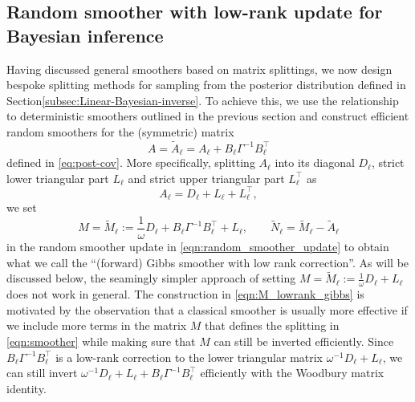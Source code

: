\documentclass[11pt,english]{article}
\theoremstyle{plain}
\theoremstyle{plain}
\theoremstyle{plain}
\theoremstyle{plain}
\numberwithin{equation}{section}
\begin{document}
\subsection{Random smoother with low-rank update for Bayesian inference}\label{subsec:Gibbs}
Having discussed general smoothers based on matrix splittings, we now design bespoke splitting methods for sampling from the posterior distribution defined in Section\ref{subsec:Linear-Bayesian-inverse}. To achieve this, we use the relationship to deterministic smoothers outlined in the previous section and construct efficient random smoothers for the (symmetric) matrix
\begin{equation}
    A = \widetilde{A}_\ell = A_\ell + B_{\ell} \Gamma^{-1} B_{\ell}^{\top}
\end{equation}
defined in \eqref{eq:post-cov}. More specifically, splitting $A_\ell$ into its diagonal $D_\ell$, strict lower triangular part $L_\ell$ and strict upper triangular part $L_\ell^\top$ as
\begin{equation}
    A_\ell = D_\ell + L_\ell + L_\ell^\top,
\end{equation}
we set
\begin{equation}
    M = \widetilde{M}_\ell :=
    \frac{1}{\omega} D_\ell + B_{\ell} \Gamma^{-1}B_{\ell}^{\top} + L_\ell,\qquad \widetilde{N}_\ell = \widetilde{M}_\ell-\widetilde{A}_\ell\label{eqn:M_lowrank_gibbs}
\end{equation}
in the random smoother update in \eqref{eqn:random_smoother_update} to obtain what we call the ``(forward) Gibbs smoother with low rank correction''. As will be discussed below, the seamingly simpler approach of setting $M = \widetilde{M}_\ell :=\frac{1}{\omega} D_\ell + L_\ell$ does not work in general. The construction in \eqref{eqn:M_lowrank_gibbs} is motivated by the observation that a classical smoother is usually more effective if we include more terms in the matrix $M$ that defines the splitting in \eqref{eqn:smoother} while making sure that $M$ can still be inverted efficiently. Since $B_{\ell} \Gamma^{-1} B_{\ell}^{\top}$ is a low-rank correction to the lower triangular matrix $\omega^{-1}D_\ell+L_\ell$, we can still invert $\omega^{-1}D_\ell+L_\ell + B_{\ell} \Gamma^{-1} B_{\ell}^{\top}$ efficiently with the Woodbury matrix identity.
\end{document}
